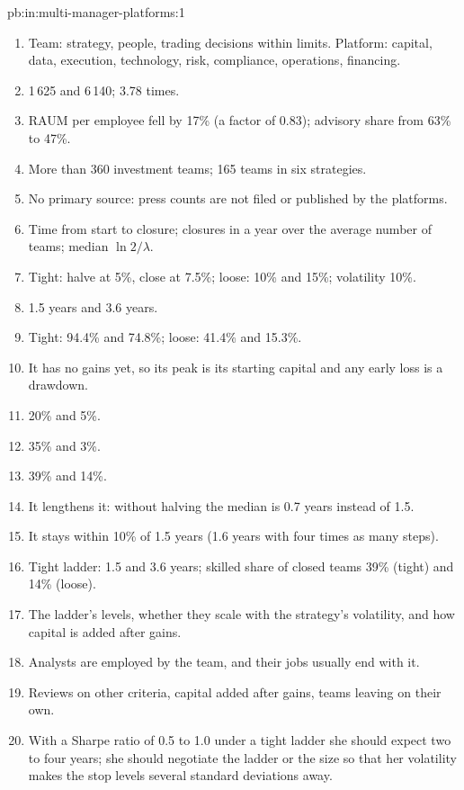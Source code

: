 \begin{solution}{pb:in:multi-manager-platforms:1}
\begin{enumerate}
\item Team: strategy, people, trading decisions within limits. Platform: capital, data, execution, technology, risk,
compliance, operations, financing.
\item 1\,625 and 6\,140; 3.78 times.
\item RAUM per employee fell by 17\% (a factor of 0.83); advisory share from 63\% to 47\%.
\item More than 360 investment teams; 165 teams in six strategies.
\item No primary source: press counts are not filed or published by the platforms.
\item Time from start to closure; closures in a year over the average number of teams; median $\ln2/\lambda$.
\item Tight: halve at 5\%, close at 7.5\%; loose: 10\% and 15\%; volatility 10\%.
\item 1.5 years and 3.6 years.
\item Tight: 94.4\% and 74.8\%; loose: 41.4\% and 15.3\%.
\item It has no gains yet, so its peak is its starting capital and any early loss is a drawdown.
\item 20\% and 5\%.
\item 35\% and 3\%.
\item 39\% and 14\%.
\item It lengthens it: without halving the median is 0.7 years instead of 1.5.
\item It stays within 10\% of 1.5 years (1.6 years with four times as many steps).
\item Tight ladder: 1.5 and 3.6 years; skilled share of closed teams 39\% (tight) and 14\% (loose).
\item The ladder's levels, whether they scale with the strategy's volatility, and how capital is added after gains.
\item Analysts are employed by the team, and their jobs usually end with it.
\item Reviews on other criteria, capital added after gains, teams leaving on their own.
\item With a Sharpe ratio of 0.5 to 1.0 under a tight ladder she should expect two to four years; she should negotiate
the ladder or the size so that her volatility makes the stop levels several standard deviations away.
\end{enumerate}
\end{solution}

